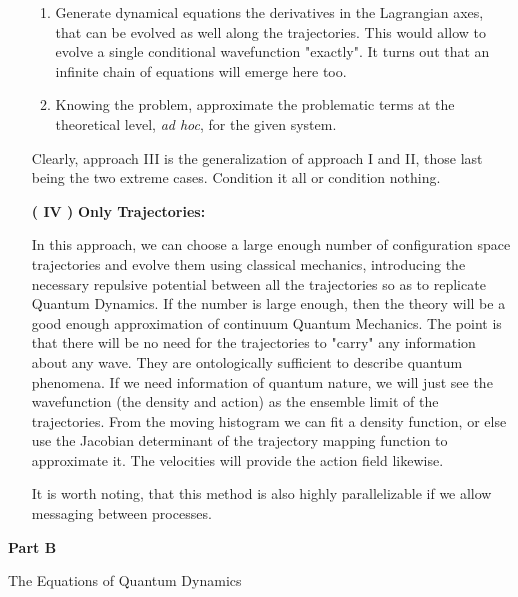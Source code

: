 \documentclass[11pt, a4paper]{article} %
\newenvironment{kapituloBerria}[1][]
  {\clearpage           %
   \thispagestyle{empty}%
   \vspace*{\stretch{2}}%
   \raggedleft          %
   {\textbf{{\fontsize{60}{40}\selectfont \hspace{+9.5cm}#1\newline \newline}}}
   \bf
   \fontsize{30}{20}\selectfont
  }
  {\par %
   \vspace{\stretch{3}} %
   \clearpage           %
  }
\begin{document}
\begin{enumerate}
\begin{enumerate}
\item Generate dynamical equations the derivatives in the Lagrangian axes, that can be evolved as well along the trajectories. This would allow to evolve a single conditional wavefunction "exactly". It turns out that an infinite chain of equations will emerge here too.

\item Knowing the problem, approximate the problematic terms at the theoretical level, {\em ad hoc}, for the given system.
\end{enumerate}

Clearly, approach III is the generalization of approach I and II, those last being the two extreme cases. Condition it all or condition nothing.\vspace{0.2cm}

\item [\bf ( IV )] {\bf Only Trajectories:}\vspace{0.15cm}

In this approach, we can choose a large enough number of configuration space trajectories and evolve them using classical mechanics, introducing the necessary repulsive potential between all the trajectories so as to replicate Quantum Dynamics. If the number is large enough, then the theory will be a good enough approximation of continuum Quantum Mechanics. The point is that there will be no need for the trajectories to "carry" any information about any wave. They are ontologically sufficient to describe quantum phenomena. If we need information of quantum nature, we will just see the wavefunction (the density and action) as the ensemble limit of the trajectories. From the moving histogram we can fit a density function, or else use the Jacobian determinant of the trajectory mapping function to approximate it. The velocities will provide the action field likewise.

It is worth noting, that this method is also highly parallelizable if we allow messaging between processes.

\end{enumerate}


\newpage
\null
\clearpage

\begin{kapituloBerria}[Part B]
The Equations of Quantum Dynamics
\end{kapituloBerria}
\newpage
\null
\clearpage
{}
\end{document}
